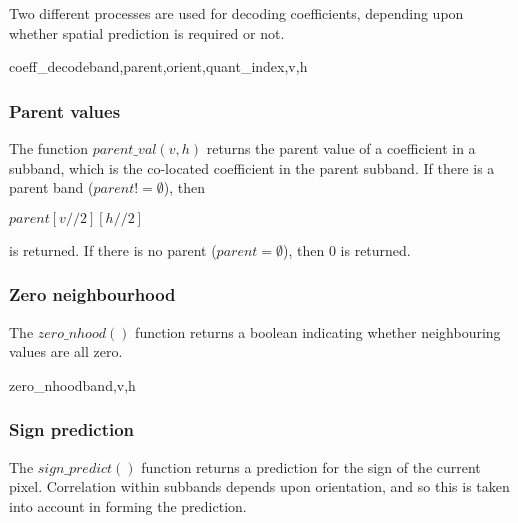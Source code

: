 Two different processes are used for decoding coefficients, depending
upon whether spatial prediction is required or not.

\begin{pseudo}{coeff\_decode}{band,parent,orient,quant\_index,v,h}
\end{pseudo}


\subsubsection{Parent values}
\label{parentval}
The function $parent\_val(v, h)$ returns the parent value of a coefficient in a subband,
which is the co-located coefficient in the parent subband. If there is a parent band 
($parent!=\emptyset$), then

$parent[v//2][h//2]$

is returned. If there is no parent ($parent=\emptyset$), then 0 is returned.

\subsubsection{Zero neighbourhood}
\label{zeronhood}

The $zero\_nhood()$ function returns a boolean indicating whether neighbouring
values are all zero.

\begin{pseudo}{zero\_nhood}{band,v,h}
    \bsRET{\false}
  \bsEND
      \bsRET{\false}
    \bsEND
  \bsEND
\bsELSE
      \bsRET{\false}
    \bsEND
  \bsEND
\bsEND
\bsRET{\true}
\end{pseudo}

\subsubsection{Sign prediction}
\label{signpredict}

The $sign\_predict()$ function returns a prediction for the sign of the 
current pixel. Correlation within subbands depends upon orientation,
and so this is taken into account in forming the prediction.


